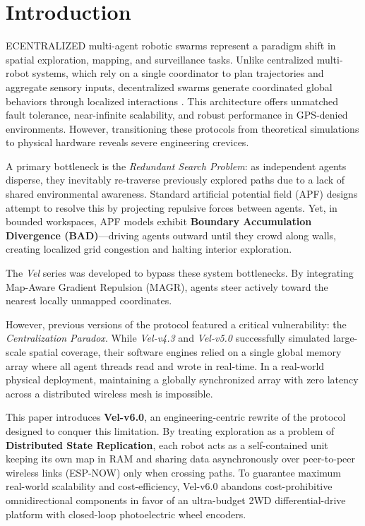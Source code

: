 \documentclass[journal,twoside]{IEEEtran}
\renewcommand{\IEEEPARstart}[2]{\noindent{\fontsize{26pt}{28pt}\selectfont #1}\MakeUppercase{#2}}
\begin{document}
\section{Introduction}
\label{sec:intro}

\IEEEPARstart{D}{ecentralized} multi-agent robotic swarms represent a paradigm shift in spatial exploration, mapping, and surveillance tasks. Unlike centralized multi-robot systems, which rely on a single coordinator to plan trajectories and aggregate sensory inputs, decentralized swarms generate coordinated global behaviors through localized interactions \cite{brambilla2013review}. This architecture offers unmatched fault tolerance, near-infinite scalability, and robust performance in GPS-denied environments. However, transitioning these protocols from theoretical simulations to physical hardware reveals severe engineering crevices. 

A primary bottleneck is the \textit{Redundant Search Problem}: as independent agents disperse, they inevitably re-traverse previously explored paths due to a lack of shared environmental awareness. Standard artificial potential field (APF) designs attempt to resolve this by projecting repulsive forces between agents. Yet, in bounded workspaces, APF models exhibit \textbf{Boundary Accumulation Divergence (BAD)}---driving agents outward until they crowd along walls, creating localized grid congestion and halting interior exploration.

The \textit{Vel} series was developed to bypass these system bottlenecks. By integrating Map-Aware Gradient Repulsion (MAGR), agents steer actively toward the nearest locally unmapped coordinates. 

However, previous versions of the protocol featured a critical vulnerability: the \textit{Centralization Paradox}. While \textit{Vel-v4.3} and \textit{Vel-v5.0} successfully simulated large-scale spatial coverage, their software engines relied on a single global memory array where all agent threads read and wrote in real-time. In a real-world physical deployment, maintaining a globally synchronized array with zero latency across a distributed wireless mesh is impossible. 

This paper introduces \textbf{Vel-v6.0}, an engineering-centric rewrite of the protocol designed to conquer this limitation. By treating exploration as a problem of \textbf{Distributed State Replication}, each robot acts as a self-contained unit keeping its own map in RAM and sharing data asynchronously over peer-to-peer wireless links (ESP-NOW) only when crossing paths. To guarantee maximum real-world scalability and cost-efficiency, Vel-v6.0 abandons cost-prohibitive omnidirectional components in favor of an ultra-budget 2WD differential-drive platform with closed-loop photoelectric wheel encoders.
\end{document}

